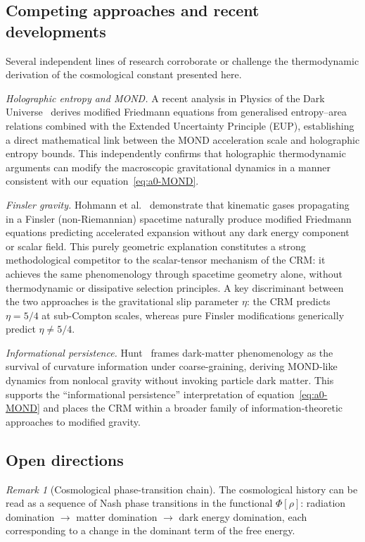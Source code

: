 \documentclass[12pt,a4paper]{article}
\theoremstyle{definition}
\theoremstyle{plain}
\theoremstyle{remark}
\newtheorem{remark}[definition]{Remark}
\begin{document}
\subsection{Competing approaches and recent developments}

Several independent lines of research corroborate or challenge the thermodynamic
derivation of the cosmological constant presented here.

\emph{Holographic entropy and MOND.}\; A recent analysis in Physics of the Dark
Universe~\cite{MONDEntropy2025} derives modified Friedmann equations from
generalised entropy--area relations combined with the Extended Uncertainty
Principle (EUP), establishing a direct mathematical link between the MOND
acceleration scale and holographic entropy bounds. This independently confirms
that holographic thermodynamic arguments can modify the macroscopic
gravitational dynamics in a manner consistent with our
equation~\eqref{eq:a0-MOND}.

\emph{Finsler gravity.}\; Hohmann et al.~\cite{FinslerJCAP2025} demonstrate that
kinematic gases propagating in a Finsler (non-Riemannian) spacetime naturally
produce modified Friedmann equations predicting accelerated expansion without
any dark energy component or scalar field. This purely geometric explanation
constitutes a strong methodological competitor to the scalar-tensor mechanism
of the CRM: it achieves the same phenomenology through spacetime geometry
alone, without thermodynamic or dissipative selection principles. A key
discriminant between the two approaches is the gravitational slip parameter
$\eta$: the CRM predicts $\eta = 5/4$ at sub-Compton scales, whereas pure
Finsler modifications generically predict $\eta \neq 5/4$.

\emph{Informational persistence.}\; Hunt~\cite{HuntMOND2026} frames dark-matter
phenomenology as the survival of curvature information under coarse-graining,
deriving MOND-like dynamics from nonlocal gravity without invoking particle
dark matter. This supports the ``informational persistence'' interpretation of
equation~\eqref{eq:a0-MOND} and places the CRM within a broader family of
information-theoretic approaches to modified gravity.

\subsection{Open directions}

\begin{remark}[Cosmological phase-transition chain]
The cosmological history can be read as a sequence of Nash phase transitions in the functional $\Phi[\rho]$: radiation domination $\to$ matter domination $\to$ dark energy domination, each corresponding to a change in the dominant term of the free energy.
\end{remark}
\end{document}
